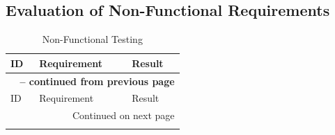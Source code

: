 \subsection{Evaluation of Non-Functional Requirements}

\begin{longtable}{l p{12cm} l}
\caption{Non-Functional Testing}\label{table:nonfunctionaltesting} \\
\toprule
ID & Requirement & Result \\
\midrule
\endfirsthead

\multicolumn{3}{c}{{\bfseries \tablename\ \thetable{} -- continued from previous page}} \\
\toprule
ID & Requirement & Result\\
\midrule
\endhead

\midrule \multicolumn{3}{r}{{Continued on next page}} \\
\endfoot

\bottomrule
\endlastfoot


\end{longtable}
